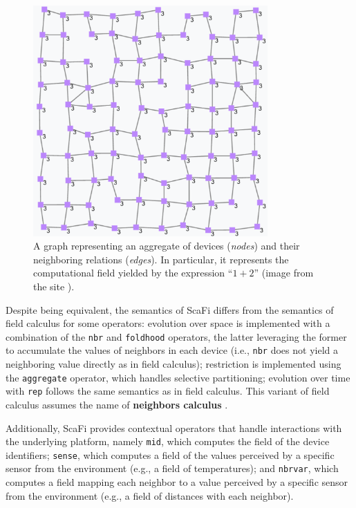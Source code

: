 \begin{figure}[!ht]
  \centering
  \includegraphics[width=0.8\textwidth]{resources/figures/constant-uniform-field.pdf}
  \caption[An example of computational field]{
    A graph representing an aggregate of devices (\textit{nodes}) and their
    neighboring relations (\textit{edges}). In particular, it represents the
    computational field yielded by the expression \enquote{$1+2$}
    (image from the site \cite{ScaFi-Documentation}).
  }
  \label{figure:constant-uniform-field}
\end{figure}

Despite being equivalent, the semantics of \ac{ScaFi} differs from the
semantics of field calculus for some operators: evolution over space is
implemented with a combination of the \texttt{nbr} and \texttt{foldhood}
operators, the latter leveraging the former to accumulate the values of
neighbors in each device (i.e., \texttt{nbr} does not yield a neighboring value
directly as in field calculus); restriction is implemented using the
\texttt{aggregate} operator, which handles selective partitioning; evolution
over time with \texttt{rep} follows the same semantics as in field calculus.
This variant of field calculus assumes the name of \textbf{neighbors calculus}
\cite{NeighborsCalculus}.

Additionally, \ac{ScaFi} provides contextual operators that handle interactions
with the underlying platform, namely \texttt{mid}, which computes the field of
the device identifiers; \texttt{sense}, which computes a field of the values
perceived by a specific sensor from the environment (e.g., a field of
temperatures); and \texttt{nbrvar}, which computes a field mapping each
neighbor to a value perceived by a specific sensor from the environment (e.g.,
a field of distances with each neighbor).

